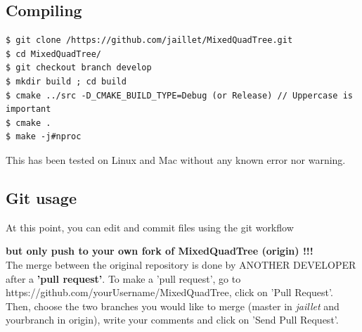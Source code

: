 \documentclass[10pt]{article}
\begin{document}
\subsection{Compiling}

{\small
\begin{verbatim}
$ git clone /https://github.com/jaillet/MixedQuadTree.git
$ cd MixedQuadTree/
$ git checkout branch develop
$ mkdir build ; cd build
$ cmake ../src -D_CMAKE_BUILD_TYPE=Debug (or Release) // Uppercase is important
$ cmake .
$ make -j#nproc
\end{verbatim}
}

This has been tested on Linux and Mac without any known error nor warning.

\subsection{Git usage}
At this point, you can edit and commit files using  the git workflow 
 
\textbf{but only push to your own fork of MixedQuadTree (origin) !!!}\\

The merge between the original repository is done by ANOTHER DEVELOPER after a \textbf{'pull request'}.
To make a 'pull request', go to https://github.com/yourUsername/MixedQuadTree, click on 'Pull Request'. Then, choose the two branches you would like to merge (master in \textit{jaillet} and yourbranch in origin), write your comments and click on 'Send Pull Request'.
\end{document}
